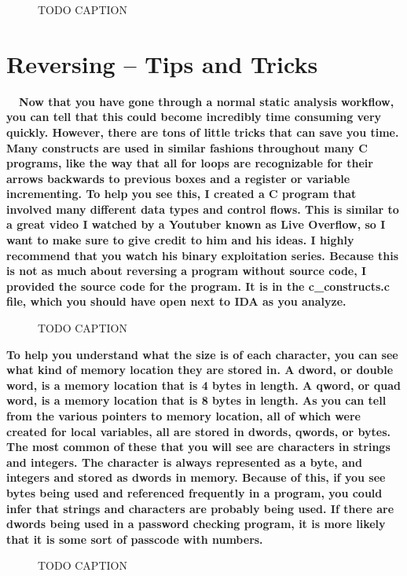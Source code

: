 \documentclass[letterpaper]{article}
\newcommand{\sitfig}[3]{
\begin{figure}[H]
\centering
\makebox[\textwidth][c]{
#2
}
\caption{#3}
\label{#1}
\end{figure}
}
\newcommand{\sitgfx}[4][scale=1.0]{
\sitfig{#3}{\texttt{[image: \#2]}}{#4}
}
\begin{document}
  
\sitgfx[width=6.5in,height=4.0626in]{FINALWORKINGDOCFORMERLYPRECURSOR-img065.png}{fig:unk}{TODO CAPTION}
 

\section{Reversing -- Tips and Tricks}

\textbf{ \ \ Now that you have gone through a normal static analysis workflow, you can tell that this could become
incredibly time consuming very quickly. However, there are tons of little tricks that can save you time. Many
constructs are used in similar fashions throughout many C programs, like the way that all for loops are recognizable
for their arrows backwards to previous boxes and a register or variable incrementing. To help you see this, I created a
C program that involved many different data types and control flows. This is similar to a great video I watched by a
Youtuber known as Live Overflow, so I want to make sure to give credit to him and his ideas. I highly recommend that
you watch his binary exploitation series. Because this is not as much about reversing a program without source code, I
provided the source code  for the program. It is in the c\_constructs.c file, which you should have open next to IDA as
you analyze.}

  
\sitgfx[width=3in,height=4.1252in]{FINALWORKINGDOCFORMERLYPRECURSOR-img066.png}{fig:unk}{TODO CAPTION}
 

\textbf{To help you understand what the size is of each character, you can see what kind of memory location they are
stored in. A dword, or double word, is a memory location that is 4 bytes in length. A qword, or quad word, is a memory
location that is 8 bytes in length. As you can tell from the various pointers to memory location, all of which were
created for local variables, all are stored in dwords, qwords, or bytes. The most common of these that you will see are
characters in strings and integers. The character is always represented as a byte, and integers and stored as dwords in
memory. Because of this, if you see bytes being used and referenced frequently in a program, you could infer that
strings and characters are probably being used. If there are dwords being used in a password checking program, it is
more likely that it is some sort of passcode with numbers.}

  
\sitgfx[width=6.4898in,height=3.802in]{FINALWORKINGDOCFORMERLYPRECURSOR-img067.png}{fig:unk}{TODO CAPTION}
 
\end{document}
